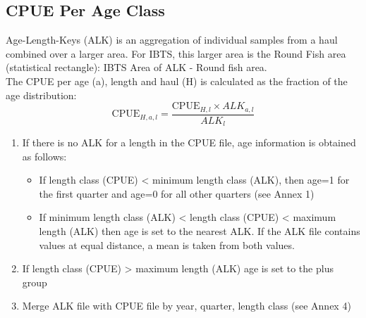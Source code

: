 \documentclass[useAMS,referee]{biom}
\numberwithin{equation}{section}
\begin{document}
\subsection{CPUE Per Age Class}

Age-Length-Keys (ALK) is an aggregation of individual samples from a haul combined over a larger area. For IBTS, this larger area is the Round Fish area (statistical rectangle): IBTS Area of ALK - Round fish area. \\

The CPUE per age (a), length and haul (H) is calculated as the fraction of the age distribution: 
\begin{equation}
\mathrm{CPUE}_{H, a, l} = \frac{\mathrm{CPUE}_{H,l} \times ALK_{a,l}}{ALK_{l}} 
\label{1}
\end{equation}


\begin{enumerate}

\item If there is no ALK for a length in the CPUE file, age information is obtained as follows: 

\begin{itemize}
\item If length class (CPUE) < minimum length class (ALK), then age=1 for the first quarter and age=0 for all other quarters (see Annex 1) \\
\item  If minimum length class (ALK) < length class (CPUE) < maximum length (ALK) then age is set to the nearest ALK. If the ALK file contains values at equal distance, a mean is taken from both values. 
\end{itemize}
\item  If length class (CPUE) > maximum length (ALK) age is set to the plus group\\
 \item  Merge ALK file with CPUE file by year, quarter, length class (see Annex 4) \\
\end{enumerate}
\end{document}
